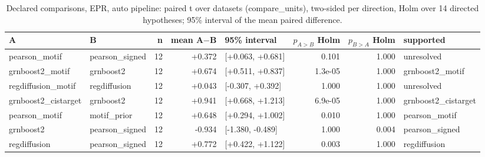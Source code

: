 \begin{table}[H]\centering\small
\caption{Declared comparisons, EPR, auto pipeline: paired t over datasets (compare\_units), two-sided per direction, Holm over 14 directed hypotheses; 95\% interval of the mean paired difference.}
\begin{tabular}{llrrlrrl}\toprule
A & B & n & mean A$-$B & 95\% interval & $p_{A>B}$ Holm & $p_{B>A}$ Holm & supported \\ \midrule
pearson\_motif & pearson\_signed & 12 & +0.372 & [+0.063, +0.681] & 0.101 & 1.000 & unresolved \\
grnboost2\_motif & grnboost2 & 12 & +0.674 & [+0.511, +0.837] & 1.3e-05 & 1.000 & grnboost2\_motif \\
regdiffusion\_motif & regdiffusion & 12 & +0.043 & [-0.307, +0.392] & 1.000 & 1.000 & unresolved \\
grnboost2\_cistarget & grnboost2 & 12 & +0.941 & [+0.668, +1.213] & 6.9e-05 & 1.000 & grnboost2\_cistarget \\
pearson\_motif & motif\_prior & 12 & +0.648 & [+0.294, +1.002] & 0.010 & 1.000 & pearson\_motif \\
grnboost2 & pearson\_signed & 12 & -0.934 & [-1.380, -0.489] & 1.000 & 0.004 & pearson\_signed \\
regdiffusion & pearson\_signed & 12 & +0.772 & [+0.422, +1.122] & 0.003 & 1.000 & regdiffusion \\
\bottomrule\end{tabular}\end{table}
